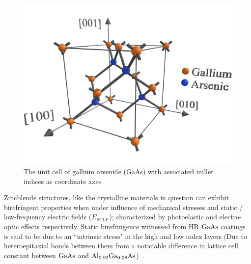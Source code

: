 \begin{figure}[!ht]
\begin{center}
\includegraphics[width=.5\textwidth]{figs/ALGAAS/gaas_unit_cell_mi.pdf}
\caption{The unit cell of gallium arsenide (GaAs) with associated miller indices as coordinate axes}
\end{center}
\label{fig:gaasuc}
\end{figure}

Zincblende structures, like the crystalline materials in question can exhibit birefringent properties when under influence of mechanical stresses and static / low-frequency electric fields ($E_\mathrm{STLF}$); characterized by photoelastic and electro-optic effects respectively. Static birefringence witnessed from HR $\mathrm{GaAs}$ coatings is said to be due to an ``intrinsic stress" in the high and low index layers (Due to heteroepitaxial bonds between them from a noticiable difference in lattice cell constant between $\mathrm{GaAs}$ and $\mathrm{Al_{0.92}Ga_{0.08}As}$)~\cite{adachi:1985}.

